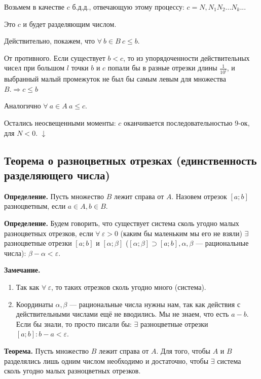 \documentclass{article}
\begin{document}
        Возьмем в качестве $c$ б.д.д., отвечающую этому процессу: $c = N,N_1N_2...N_k...$

        Это $c$ и будет разделяющим числом.
        
        Действительно, покажем, что $\forall\ b \in B\ c \leq b$.

        От противного. Если существует $b < c$, то из упорядоченности действительных чисел при большом $l$ точки $b$ и $c$ попали бы в разные отрезки длины $\frac{1}{10^l}$, и выбранный малый промежуток не был бы самым левым для множества $B. \Rightarrow c \leq b$

        Аналогично $\forall\ a \in A\ a \leq c$.

        Остались неосвещенными моменты: $c$ оканчивается последовательностью 9-ок, для $N < 0$. $\downarrow$

        \subsection{Теорема о разноцветных отрезках (единственность разделяющего числа)}
        \textbf{Определение.} Пусть множество $B$ лежит справа от $A$. Назовем отрезок $[a; b]$ разноцветным, если $a \in A, b \in B$.

        \textbf{Определение.} Будем говорить, что существует система сколь угодно малых разноцветных отрезков, если $\forall\ \varepsilon > 0$ (каким бы маленьким мы его не взяли) $\exists$ разноцветные отрезки $[a; b]$ и $[\alpha; \beta]$ ($[\alpha; \beta] \supset [a; b], \alpha, \beta$ --- рациональные числа): $\beta - \alpha < \varepsilon$. 

        \textbf{Замечание.}

        \begin{enumerate}
            \item Так как $\forall\ \varepsilon$, то таких отрезков сколь угодно много (система).
            \item Координаты $\alpha, \beta$ --- рациональные числа нужны нам, так как действия с действительными числами ещё не вводились. Мы не знаем, что есть $a - b$. Если бы знали, то просто писали бы: $\exists$ разноцветные отрезки $[a; b]: b - a < \varepsilon$.
        \end{enumerate}

        \textbf{Теорема.} Пусть множество $B$ лежит справа от $A$. Для того, чтобы $A$ и $B$ разделялись лишь одним числом необходимо и достаточно, чтобы $\exists$ система сколь угодно малых разноцветных отрезков. 
\end{document}
